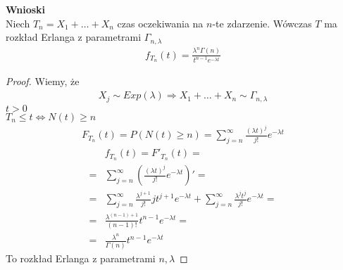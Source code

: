 \textbf{Wnioski}\\
Niech $ T_n=X_1+\dots+X_n $ czas oczekiwania na $ n $-te zdarzenie. Wówczas $ T $ ma rozkład Erlanga z parametrami $ \Gamma_{n,\lambda} $
\begin{gather*}
f_{T_n}(t)=\frac{\lambda^n	\Gamma(n)}{t^{n-1}e^{-\lambda t}}
\end{gather*}
\begin{proof}
Wiemy, że
\begin{gather*}
X_j\sim Exp(\lambda)\Rightarrow X_1+\dots+X_n\sim\Gamma_{n,\lambda}
\end{gather*}
$ t>0 $\\
$ T_n\le t\Leftrightarrow N(t)\ge n $
\begin{gather*}
F_{T_n}(t)=P\left(N(t)\ge n\right)=
\sum_{j=n}^{\infty }\frac{\left(\lambda t\right)^j}{j!}e^{-\lambda t}
\end{gather*}
\begin{align*}
&f_{T_n}(t)=F'_{T_n}(t)
=\\=&
\sum_{j=n}^{\infty }\left(\frac{\left(\lambda t\right)^j}{j!}e^{-\lambda t}\right)'
=\\=&
\sum_{j=n}^{\infty }
\frac{\lambda^{j+1}}{j!}jt^{j+1}e^{-\lambda t}+
\sum_{j=n}^{\infty }\frac{\lambda^jt^j}{j!}e^{-\lambda t}
=\\=&
\frac{\lambda^{(n-1)+1}}{(n-1)!}t^{n-1}e^{-\lambda t}
=\\=&
\frac{\lambda^n}{\Gamma(n)}t^{n-1}e^{-\lambda t}
\end{align*}
To rozkład Erlanga z parametrami $ n,\lambda $
\end{proof}
